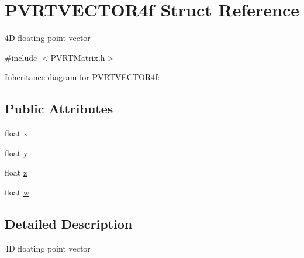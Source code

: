 \hypertarget{struct_p_v_r_t_v_e_c_t_o_r4f}{\section{P\+V\+R\+T\+V\+E\+C\+T\+O\+R4f Struct Reference}
\label{struct_p_v_r_t_v_e_c_t_o_r4f}
}


4\+D floating point vector  




{\ttfamily \#include $<$P\+V\+R\+T\+Matrix.\+h$>$}



Inheritance diagram for P\+V\+R\+T\+V\+E\+C\+T\+O\+R4f\+:
\subsection*{Public Attributes}
\begin{DoxyCompactItemize}
\item 
float \hyperlink{struct_p_v_r_t_v_e_c_t_o_r4f_ac992f76e6db0441d0d34342849642ef2}{x}
\item 
float \hyperlink{struct_p_v_r_t_v_e_c_t_o_r4f_a40b8f5d5ce0d67a4e5a304903b0624c6}{y}
\item 
float \hyperlink{struct_p_v_r_t_v_e_c_t_o_r4f_a18e646979526d221cdc53203e9fdd4e4}{z}
\item 
float \hyperlink{struct_p_v_r_t_v_e_c_t_o_r4f_aaeda004b84816254d27d893acbdcad9c}{w}
\end{DoxyCompactItemize}


\subsection{Detailed Description}
4\+D floating point vector 



 


